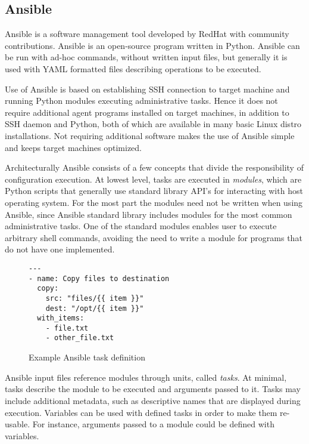 \documentclass[officiallayout]{tktla}
\begin{document}
\subsection{Ansible}

Ansible \cite{ansible} is a software management tool developed by RedHat with
community contributions. Ansible is an open-source program written in Python.
Ansible can be run with ad-hoc commands, without written input files, but
generally it is used with YAML formatted files describing operations to be
executed.

Use of Ansible is based on establishing SSH connection to target machine and
running Python modules executing administrative tasks. Hence it does not
require additional  agent programs installed on target machines, in addition to
SSH daemon and Python, both of which are available in many basic Linux distro
installations. Not requiring additional software makes the use of Ansible
simple and keeps target machines optimized.

Architecturally Ansible consists of a few concepts that divide the
responsibility of configuration execution. At lowest level, tasks are executed
in \textit{modules}, which are Python scripts that generally use standard
library API's for interacting with host operating system. For the most part the
modules need not be written when using Ansible, since Ansible standard library
includes modules for the most common administrative tasks. One of the standard
modules enables user to execute arbitrary shell commands, avoiding the need to
write a module for programs that do not have one implemented.

\begin{figure}[t]
\centering
\begin{verbatim}
---
- name: Copy files to destination
  copy:
    src: "files/{{ item }}"
    dest: "/opt/{{ item }}"
  with_items:
    - file.txt
    - other_file.txt
\end{verbatim}

\caption{Example Ansible task definition}
\label{fig:ansible-task}
\end{figure}

Ansible input files reference modules through units, called \textit{tasks}.
At minimal, tasks describe the module to be executed and arguments passed to
it. Tasks may include additional metadata, such as descriptive names that are
displayed during execution. Variables can be used with defined tasks in order
to make them re-usable. For instance, arguments passed to a module could be
defined with variables.
\end{document}
